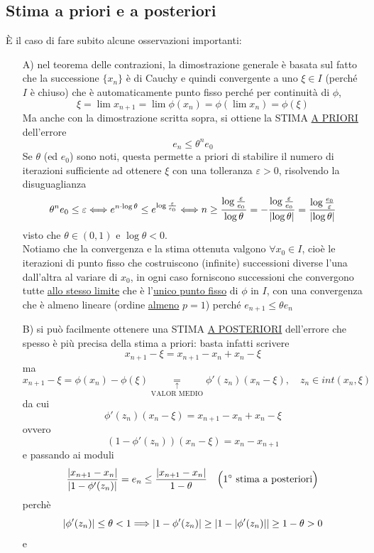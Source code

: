 \subsection{Stima a priori e a posteriori}
È il caso di fare subito alcune osservazioni importanti: 
\begin{enumerate}
    \item [A)] nel teorema delle contrazioni, la dimostrazione generale è basata sul fatto che la successione $\{ x_n \}$ è di Cauchy e quindi convergente a uno $\xi \in I$ (perché $I$ è chiuso) che è automaticamente punto fisso perché per continuità di $\phi$, 
    \[\xi = \lim x_{n+1} = \lim \phi(x_n) = \phi(\lim x_n) = \phi(\xi)\]
    Ma anche con la dimostrazione scritta sopra, si ottiene la STIMA \uline{A PRIORI} dell'errore \[e_n \leq \theta^n e_0\]
    Se $\theta$ (ed $e_0$) sono noti, questa permette a priori di stabilire il numero di iterazioni sufficiente ad ottenere $\xi$ con una tolleranza $\varepsilon > 0$, risolvendo la disuguaglianza
    \[\theta^n e_0 \leq \varepsilon \Longleftrightarrow e^{n\cdot \log{\theta}} \leq e^{\log{\frac{\varepsilon}{e_0}}} \Longleftrightarrow n \geq \frac{\log{\frac{\varepsilon}{e_0}}}{\log{\theta}} = -\frac{\log{\frac{\varepsilon}{e_0}}}{\lvert\log{\theta}\rvert} = \frac{\log{\frac{e_0}{\varepsilon}}}{\lvert\log{\theta}\rvert}\]
    visto che $\theta \in (0,1)$ e $\log{\theta} < 0$.\\
    Notiamo che la convergenza e la stima ottenuta valgono $\forall x_0 \in I$, cioè le iterazioni di punto fisso che costruiscono (infinite) successioni diverse l'una dall'altra al variare di $x_0$, in ogni caso forniscono successioni che convergono tutte \uline{allo stesso limite} che è l'\uline{unico punto fisso} di $\phi$ in $I$, con una convergenza che è almeno lineare (ordine \uline{almeno} $p=1$) perché $e_{n+1} \leq \theta e_n$
    \item [B)] si può facilmente ottenere una STIMA \uline{A POSTERIORI} dell'errore che spesso è più precisa della stima a priori: basta infatti scrivere
    \[ x_{n+1} - \xi = x_{n+1} - x_n + x_n - \xi \] ma 
    \[x_{n+1}-\xi =\phi(x_n) - \phi(\xi) \underset{\text{VALOR  MEDIO}}{\underset{\uparrow}{=}} \phi'(z_n)(x_n - \xi), \quad z_n \in int(x_n,\xi) \] da cui 
    \[ \phi'(z_n)(x_n - \xi) = x_{n+1}-x_n+x_n-\xi \] ovvero 
    \[ (1-\phi'(z_n))(x_n - \xi) = x_n-x_{n+1} \]
    e passando ai moduli
    \[\frac{\lvert x_{n+1}-x_n\rvert}{\lvert1-\phi'(z_n)\rvert} = e_n \le \frac{\lvert x_{n+1}-x_n\rvert}{1-\theta} \quad \Bigl( 1^\circ \text{ stima a posteriori}\Bigr)\] perchè 
    \[ \lvert\phi'(z_n)\rvert \le \theta < 1 \Longrightarrow \lvert1-\phi'(z_n)\rvert \ge \lvert1-\lvert\phi'(z_n)\rvert\rvert \ge 1 - \theta > 0\] e 

\end{enumerate}
